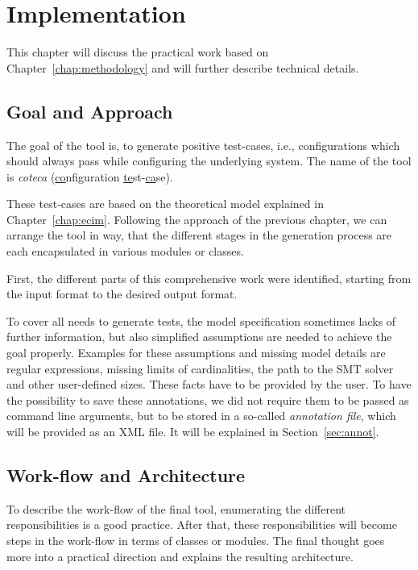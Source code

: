 \chapter{Implementation}\label{chap:practice}

This chapter will discuss the practical work based on Chapter~\ref{chap:methodology} and will further describe technical details.

\section{Goal and Approach}\label{sec:goal-approach}

The goal of the tool is, to generate positive test-cases, i.e., configurations which should always pass while configuring the underlying system. The name of the tool is \emph{coteca} (\underline{co}nfiguration \underline{te}st-\underline{ca}se).

These test-cases are based on the theoretical model explained in Chapter~\ref{chap:ecim}. Following the approach of the previous chapter, we can arrange the tool in way, that the different stages in the generation process are each encapsulated in various modules or classes.

First, the different parts of this comprehensive work were identified, starting from the input format to the desired output format. 

To cover all needs to generate tests, the model specification sometimes lacks of further information, but also simplified assumptions are needed to achieve the goal properly.
Examples for these assumptions and missing model details are regular expressions, missing limits of cardinalities, the path to the SMT solver and other user-defined sizes.
These facts have to be provided by the user. To have the possibility to save these annotations, we did not require them to be passed as command line arguments, but to be stored in a so-called \emph{annotation file}, which will be provided as an XML file. It will be explained in Section~\ref{sec:annot}.


\section{Work-flow and Architecture}\label{sec:arch}

To describe the work-flow of the final tool, enumerating the different responsibilities is a good practice. After that, these responsibilities will become steps in the work-flow in terms of classes or modules. The final thought goes more into a practical direction and explains the resulting architecture.

